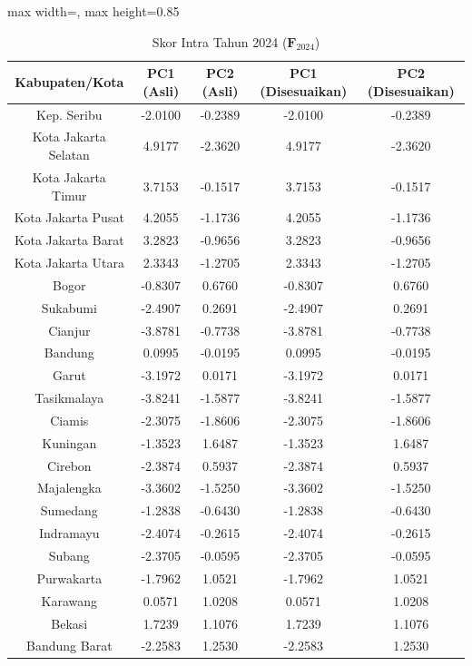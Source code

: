 \begin{table}[H]
\centering
\caption{Skor Intra Tahun 2024 ($\mathbf{F}_{2024}$)} \label{tab:app1skor_intra_2024}
\begin{adjustbox}{max width=\textwidth, max height=0.85\textheight}
\begin{tabular}{|c|c|c|c|c|}
\hline
\textbf{Kabupaten/Kota} & \textbf{PC1 (Asli)} & \textbf{PC2 (Asli)} & \textbf{PC1 (Disesuaikan)} & \textbf{PC2 (Disesuaikan)} \\
\hline
Kep. Seribu & -2.0100 & -0.2389 & -2.0100 & -0.2389 \\
Kota Jakarta Selatan & 4.9177 & -2.3620 & 4.9177 & -2.3620 \\
Kota Jakarta Timur & 3.7153 & -0.1517 & 3.7153 & -0.1517 \\
Kota Jakarta Pusat & 4.2055 & -1.1736 & 4.2055 & -1.1736 \\
Kota Jakarta Barat & 3.2823 & -0.9656 & 3.2823 & -0.9656 \\
Kota Jakarta Utara & 2.3343 & -1.2705 & 2.3343 & -1.2705 \\
Bogor & -0.8307 & 0.6760 & -0.8307 & 0.6760 \\
Sukabumi & -2.4907 & 0.2691 & -2.4907 & 0.2691 \\
Cianjur & -3.8781 & -0.7738 & -3.8781 & -0.7738 \\
Bandung & 0.0995 & -0.0195 & 0.0995 & -0.0195 \\
Garut & -3.1972 & 0.0171 & -3.1972 & 0.0171 \\
Tasikmalaya & -3.8241 & -1.5877 & -3.8241 & -1.5877 \\
Ciamis & -2.3075 & -1.8606 & -2.3075 & -1.8606 \\
Kuningan & -1.3523 & 1.6487 & -1.3523 & 1.6487 \\
Cirebon & -2.3874 & 0.5937 & -2.3874 & 0.5937 \\
Majalengka & -3.3602 & -1.5250 & -3.3602 & -1.5250 \\
Sumedang & -1.2838 & -0.6430 & -1.2838 & -0.6430 \\
Indramayu & -2.4074 & -0.2615 & -2.4074 & -0.2615 \\
Subang & -2.3705 & -0.0595 & -2.3705 & -0.0595 \\
Purwakarta & -1.7962 & 1.0521 & -1.7962 & 1.0521 \\
Karawang & 0.0571 & 1.0208 & 0.0571 & 1.0208 \\
Bekasi & 1.7239 & 1.1076 & 1.7239 & 1.1076 \\
Bandung Barat & -2.2583 & 1.2530 & -2.2583 & 1.2530 \\

\end{tabular}
\end{adjustbox}
\end{table}
